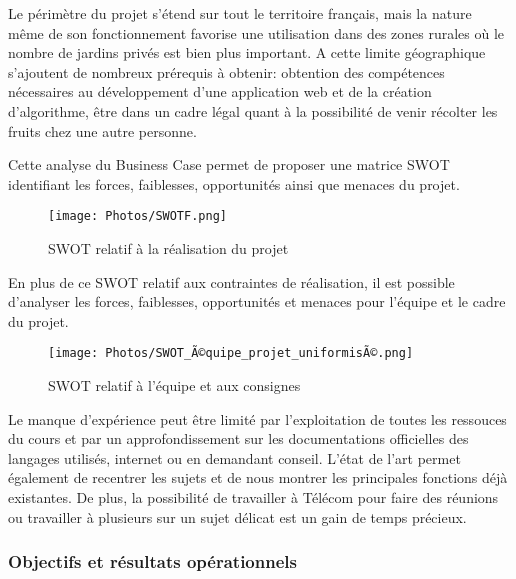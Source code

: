 \documentclass{article}
\begin{document}
Le périmètre du projet s'étend sur tout le territoire français, mais la nature même de son fonctionnement favorise une utilisation dans des zones rurales où le nombre de jardins privés est bien plus important.
A cette limite géographique s'ajoutent de nombreux prérequis à obtenir: obtention des compétences nécessaires au développement d'une application web et de la création d'algorithme, être dans un cadre légal quant à la possibilité de venir récolter les fruits chez une autre personne.

\vspace{4mm}
 
Cette analyse du Business Case permet de proposer une matrice SWOT identifiant les forces, faiblesses, opportunités ainsi que menaces du projet.

\vspace{2mm}             
  
\begin{figure}[h!]
\centering
\texttt{[image: Photos/SWOTF.png]}
\caption{SWOT relatif à la réalisation du projet}
\label{fig:my_label}
\end{figure}

\newline 
En plus de ce SWOT relatif aux contraintes de réalisation, il est possible d'analyser les forces, faiblesses, opportunités et menaces pour l'équipe et le cadre du projet. 
\begin{figure}[h!]
    \centering
    \texttt{[image: Photos/SWOT\_Ã©quipe\_projet\_uniformisÃ©.png]}
    \caption{SWOT relatif à l'équipe et aux consignes}
    \label{fig:my_label}
\end{figure}

\newline
Le manque d'expérience peut être limité par l'exploitation de toutes les ressouces du cours et par un approfondissement sur les documentations officielles des langages utilisés, internet ou en demandant conseil.
L'état de l'art permet également de recentrer les sujets et de nous montrer les principales fonctions déjà existantes. 
De plus, la possibilité de travailler à Télécom pour faire des réunions ou travailler à plusieurs sur un sujet délicat est un gain de temps précieux.

\vspace{1cm}
\maketitle
\subsubsection{Objectifs et résultats opérationnels}
\end{document}

